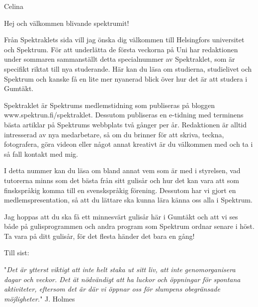 \documentclass{spektraklet}
\begin{document}
\begin{ledaren}{Celina}


Hej och välkommen blivande spektrumit!

Från Spektraklets sida vill jag önska dig välkommen till Helsingfors universitet och Spektrum. För att underlätta de första veckorna på Uni har redaktionen under sommaren sammanställt detta specialnummer av Spektraklet, som är specifikt riktat till nya studerande. Här kan du läsa om studierna, studielivet och Spektrum och kanske få en lite mer nyanerad blick över hur det är att studera i Gumtäkt.

Spektraklet är Spektrums medlemstidning som publiseras på bloggen www.spektrun.fi/spektraklet. Dessutom publiseras en e-tidning med terminens bästa artiklar på Spektrums webbplats två gånger per år. Redaktionen är alltid intresserad av nya medarbetare, så om du brinner för att skriva, teckna, fotografera, göra videon eller något annat kreativt är du välkommen med och ta i så fall kontakt med mig.

I detta nummer kan du läsa om bland annat vem som är med i styrelsen, vad tutorerna minns som det bästa från sitt gulisår och hur det kan vara att som finskspråkig komma till en svenskspråkig förening. Dessutom har vi gjort en medlemspresentation, så att du lättare ska kunna lära känna oss alla i Spektrum.

Jag hoppas att du ska få ett minnesvärt gulisår här i Gumtäkt och att vi ses både på gulisprogrammen och andra program som Spektrum ordnar senare i höst. Ta vara på ditt gulisår, för det flesta händer det bara en gång!

Till sist:

"\textit{Det är ytterst viktigt att inte helt staka ut sitt liv, att inte genomorganisera dagar och veckor. Det ät nödvändigt att ha luckor och öppningar för spontana aktiviteter, eftersom det är där vi öppnar oss för slumpens obegränsade möjligheter.}"  J. Holmes

\end{ledaren}
\end{document}
